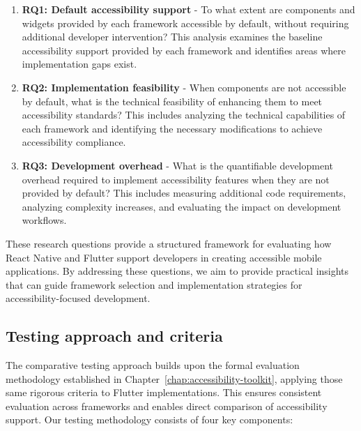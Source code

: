\begin{enumerate}
    \item \textbf{RQ1: Default accessibility support} - To what extent are components and widgets provided by each framework accessible by default, without requiring additional developer intervention? This analysis examines the baseline accessibility support provided by each framework and identifies areas where implementation gaps exist.
    
    \item \textbf{RQ2: Implementation feasibility} - When components are not accessible by default, what is the technical feasibility of enhancing them to meet accessibility standards? This includes analyzing the technical capabilities of each framework and identifying the necessary modifications to achieve accessibility compliance.
    
    \item \textbf{RQ3: Development overhead} - What is the quantifiable development overhead required to implement accessibility features when they are not provided by default? This includes measuring additional code requirements, analyzing complexity increases, and evaluating the impact on development workflows.
\end{enumerate}

These research questions provide a structured framework for evaluating how React Native and Flutter support developers in creating accessible mobile applications. By addressing these questions, we aim to provide practical insights that can guide framework selection and implementation strategies for accessibility-focused development.

\subsection{Testing approach and criteria}

The comparative testing approach builds upon the formal evaluation methodology established in Chapter~\ref{chap:accessibility-toolkit}, applying those same rigorous criteria to Flutter implementations. This ensures consistent evaluation across frameworks and enables direct comparison of accessibility support. Our testing methodology consists of four key components:

